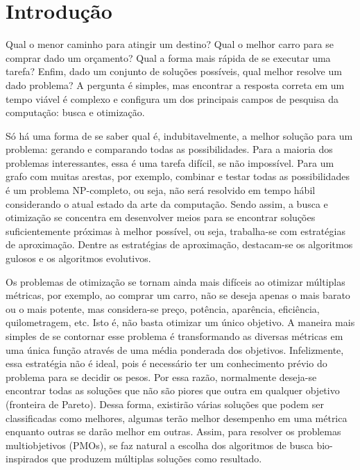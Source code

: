\chapter[Introdução]{Introdução}

Qual o menor caminho para atingir um destino? Qual o melhor carro para se comprar dado um orçamento? Qual a forma mais rápida de se executar uma tarefa? Enfim, dado um conjunto de soluções possíveis, qual melhor resolve um dado problema? A pergunta é simples, mas encontrar a resposta correta em um tempo viável é complexo e configura um dos principais campos de pesquisa da computação: busca e otimização.

Só há uma forma de se saber qual é, indubitavelmente, a melhor solução para um problema: gerando e comparando todas as possibilidades. Para a maioria dos problemas interessantes, essa é uma tarefa difícil, se não impossível. Para um grafo com muitas arestas, por exemplo, combinar e testar todas as possibilidades é um problema NP-completo, ou seja, não será resolvido em tempo hábil considerando o atual estado da arte da computação. Sendo assim, a busca e otimização se concentra em desenvolver meios para se encontrar soluções suficientemente próximas à melhor possível, ou seja, trabalha-se com estratégias de aproximação. Dentre as estratégias de aproximação, destacam-se os algoritmos gulosos e os algoritmos evolutivos.

Os problemas de otimização se tornam ainda mais difíceis ao otimizar múltiplas métricas, por exemplo, ao comprar um carro, não se deseja apenas o mais barato ou o mais potente, mas considera-se preço, potência, aparência, eficiência, quilometragem, etc. Isto é, não basta otimizar um único objetivo. A maneira mais simples de se contornar esse problema é transformando as diversas métricas em uma única função através de uma média ponderada dos objetivos. Infelizmente, essa estratégia não é ideal, pois é necessário ter um conhecimento prévio do problema para se decidir os pesos. Por essa razão, normalmente deseja-se encontrar todas as soluções que não são piores que outra em qualquer objetivo (fronteira de Pareto). Dessa forma, existirão várias soluções que podem ser classificadas como melhores, algumas terão melhor desempenho em uma métrica enquanto outras se darão melhor em outras. Assim, para resolver os problemas multiobjetivos (PMOs), se faz natural a escolha dos algoritmos de busca bio-inspirados que produzem múltiplas soluções como resultado.


